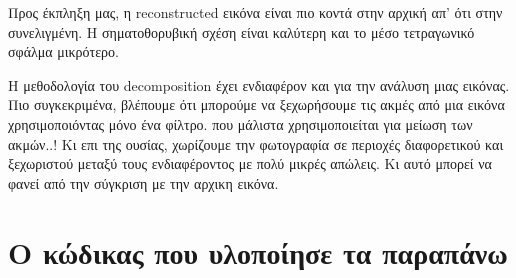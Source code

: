 \documentclass[11pt]{scrartcl} %
\begin{document}
Προς έκπληξη μας, η reconstructed εικόνα είναι πιο κοντά στην αρχική απ' ότι στην συνελιγμένη. Η σηματοθορυβική σχέση είναι καλύτερη και το μέσο τετραγωνικό σφάλμα μικρότερο.

Η μεθοδολογία του decomposition έχει ενδιαφέρον και για την ανάλυση μιας εικόνας. Πιο συγκεκριμένα, βλέπουμε ότι μπορούμε να ξεχωρήσουμε τις ακμές από μια εικόνα χρησιμοποιόντας
μόνο ένα φίλτρο. που μάλιστα χρησιμοποιείται για μείωση των ακμών..! Κι επι της ουσίας, χωρίζουμε την φωτογραφία σε περιοχές διαφορετικού και ξεχωριστού μεταξύ τους ενδιαφέροντος
με πολύ μικρές απώλεις. Κι αυτό μπορεί να φανεί από την σύγκριση με την αρχικη εικόνα.


\section{Ο κώδικας που υλοποίησε τα παραπάνω}



\end{document}
